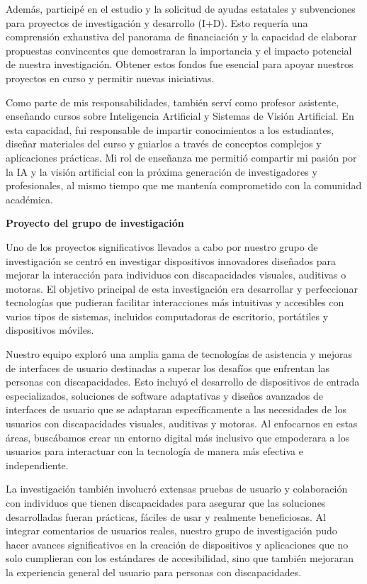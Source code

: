 \documentclass[a4paper,10pt]{article}
\newcommand{\cvsubsubsection}[1]{
\begin{tcolorbox}[colback=gray!10, colframe=gray!10, boxrule=0pt, arc=0mm, outer arc=0mm, width=\textwidth, boxsep=0pt, left=4mm, right=4mm, top=1mm, bottom=1mm]
  \textbf{#1}
\end{tcolorbox}
\vspace{1mm}
}
\begin{document}
Además, participé en el estudio y la solicitud de ayudas estatales y subvenciones para proyectos de investigación y desarrollo (I+D). Esto requería una comprensión exhaustiva del panorama de financiación y la capacidad de elaborar propuestas convincentes que demostraran la importancia y el impacto potencial de nuestra investigación. Obtener estos fondos fue esencial para apoyar nuestros proyectos en curso y permitir nuevas iniciativas.

Como parte de mis responsabilidades, también serví como profesor asistente, enseñando cursos sobre Inteligencia Artificial y Sistemas de Visión Artificial. En esta capacidad, fui responsable de impartir conocimientos a los estudiantes, diseñar materiales del curso y guiarlos a través de conceptos complejos y aplicaciones prácticas. Mi rol de enseñanza me permitió compartir mi pasión por la IA y la visión artificial con la próxima generación de investigadores y profesionales, al mismo tiempo que me mantenía comprometido con la comunidad académica.

\cvsubsubsection{Proyecto del grupo de investigación}
Uno de los proyectos significativos llevados a cabo por nuestro grupo de investigación se centró en investigar dispositivos innovadores diseñados para mejorar la interacción para individuos con discapacidades visuales, auditivas o motoras. El objetivo principal de esta investigación era desarrollar y perfeccionar tecnologías que pudieran facilitar interacciones más intuitivas y accesibles con varios tipos de sistemas, incluidos computadoras de escritorio, portátiles y dispositivos móviles.

Nuestro equipo exploró una amplia gama de tecnologías de asistencia y mejoras de interfaces de usuario destinadas a superar los desafíos que enfrentan las personas con discapacidades. Esto incluyó el desarrollo de dispositivos de entrada especializados, soluciones de software adaptativas y diseños avanzados de interfaces de usuario que se adaptaran específicamente a las necesidades de los usuarios con discapacidades visuales, auditivas y motoras. Al enfocarnos en estas áreas, buscábamos crear un entorno digital más inclusivo que empoderara a los usuarios para interactuar con la tecnología de manera más efectiva e independiente.

La investigación también involucró extensas pruebas de usuario y colaboración con individuos que tienen discapacidades para asegurar que las soluciones desarrolladas fueran prácticas, fáciles de usar y realmente beneficiosas. Al integrar comentarios de usuarios reales, nuestro grupo de investigación pudo hacer avances significativos en la creación de dispositivos y aplicaciones que no solo cumplieran con los estándares de accesibilidad, sino que también mejoraran la experiencia general del usuario para personas con discapacidades.
\end{document}
